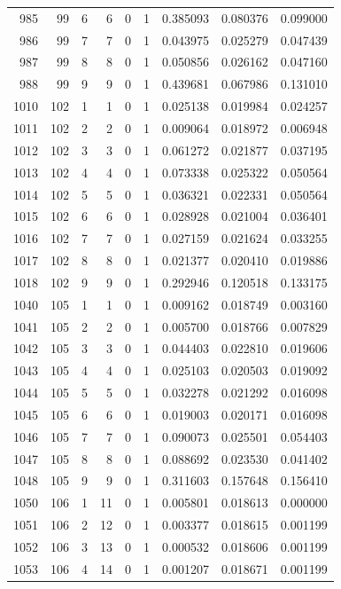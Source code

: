 \begin{longtable}{rrrrrrrrr}
985 & 99 & 6 & 6 & 0 & 1 & 0.385093 & 0.080376 & 0.099000 \\
986 & 99 & 7 & 7 & 0 & 1 & 0.043975 & 0.025279 & 0.047439 \\
987 & 99 & 8 & 8 & 0 & 1 & 0.050856 & 0.026162 & 0.047160 \\
988 & 99 & 9 & 9 & 0 & 1 & 0.439681 & 0.067986 & 0.131010 \\
1010 & 102 & 1 & 1 & 0 & 1 & 0.025138 & 0.019984 & 0.024257 \\
1011 & 102 & 2 & 2 & 0 & 1 & 0.009064 & 0.018972 & 0.006948 \\
1012 & 102 & 3 & 3 & 0 & 1 & 0.061272 & 0.021877 & 0.037195 \\
1013 & 102 & 4 & 4 & 0 & 1 & 0.073338 & 0.025322 & 0.050564 \\
1014 & 102 & 5 & 5 & 0 & 1 & 0.036321 & 0.022331 & 0.050564 \\
1015 & 102 & 6 & 6 & 0 & 1 & 0.028928 & 0.021004 & 0.036401 \\
1016 & 102 & 7 & 7 & 0 & 1 & 0.027159 & 0.021624 & 0.033255 \\
1017 & 102 & 8 & 8 & 0 & 1 & 0.021377 & 0.020410 & 0.019886 \\
1018 & 102 & 9 & 9 & 0 & 1 & 0.292946 & 0.120518 & 0.133175 \\
1040 & 105 & 1 & 1 & 0 & 1 & 0.009162 & 0.018749 & 0.003160 \\
1041 & 105 & 2 & 2 & 0 & 1 & 0.005700 & 0.018766 & 0.007829 \\
1042 & 105 & 3 & 3 & 0 & 1 & 0.044403 & 0.022810 & 0.019606 \\
1043 & 105 & 4 & 4 & 0 & 1 & 0.025103 & 0.020503 & 0.019092 \\
1044 & 105 & 5 & 5 & 0 & 1 & 0.032278 & 0.021292 & 0.016098 \\
1045 & 105 & 6 & 6 & 0 & 1 & 0.019003 & 0.020171 & 0.016098 \\
1046 & 105 & 7 & 7 & 0 & 1 & 0.090073 & 0.025501 & 0.054403 \\
1047 & 105 & 8 & 8 & 0 & 1 & 0.088692 & 0.023530 & 0.041402 \\
1048 & 105 & 9 & 9 & 0 & 1 & 0.311603 & 0.157648 & 0.156410 \\
1050 & 106 & 1 & 11 & 0 & 1 & 0.005801 & 0.018613 & 0.000000 \\
1051 & 106 & 2 & 12 & 0 & 1 & 0.003377 & 0.018615 & 0.001199 \\
1052 & 106 & 3 & 13 & 0 & 1 & 0.000532 & 0.018606 & 0.001199 \\
1053 & 106 & 4 & 14 & 0 & 1 & 0.001207 & 0.018671 & 0.001199 \\

\end{longtable}
